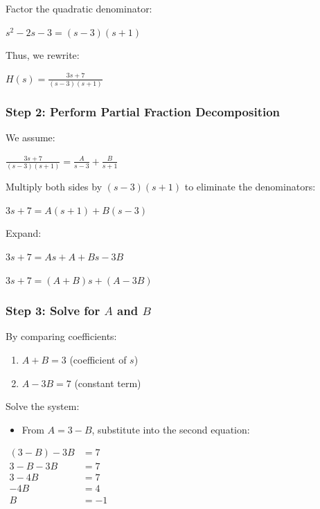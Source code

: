 \documentclass[11pt]{article}
\providecommand{\tightlist}{%
      \setlength{\itemsep}{0pt}\setlength{\parskip}{0pt}}
\begin{document}
Factor the quadratic denominator:

\(s^2 - 2s - 3 = (s - 3)(s + 1)\)

Thus, we rewrite:

\(H(s) = \frac{3s + 7}{(s - 3)(s + 1)}\)

\subsubsection{\texorpdfstring{\textbf{Step 2: Perform Partial Fraction
Decomposition}}{Step 2: Perform Partial Fraction Decomposition}}\label{step-2-perform-partial-fraction-decomposition}

We assume:

\(\frac{3s + 7}{(s - 3)(s + 1)} = \frac{A}{s - 3} + \frac{B}{s + 1}\)

Multiply both sides by \((s - 3)(s + 1)\) to eliminate the denominators:

\(3s + 7 = A(s + 1) + B(s - 3)\)

Expand:

\(3s + 7 = A s + A + B s - 3B\)

\(3s + 7 = (A + B)s + (A - 3B)\)

\subsubsection{\texorpdfstring{\textbf{Step 3: Solve for \(A\) and
\(B\)}}{Step 3: Solve for A and B}}\label{step-3-solve-for-a-and-b}

By comparing coefficients:

\begin{enumerate}
\def\labelenumi{\arabic{enumi}.}
\tightlist
\item
  \(A + B = 3\) (coefficient of \(s\))
\item
  \(A - 3B = 7\) (constant term)
\end{enumerate}

Solve the system:

\begin{itemize}
\tightlist
\item
  From \(A = 3 - B\), substitute into the second equation:
\end{itemize}

\(\begin{align}
(3 - B) - 3B &= 7 \\
3 - B - 3B &= 7 \\
3 - 4B &= 7 \\
-4B &= 4 \\
B &= -1
\end{align}\)
\end{document}
